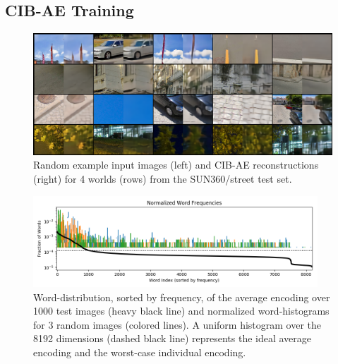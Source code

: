 \subsection{CIB-AE Training}
\begin{figure}
    \centering
    \includegraphics[width=\textwidth]{figures/ptz/mc3ae_encodings}
    \caption{Random example input images (left) and CIB-AE reconstructions (right) for 4 worlds (rows) from the SUN360/street test set.}
    \label{fig:cibae_encodings}
\end{figure}

\begin{figure}
    \centering
    \includegraphics[width=0.95\textwidth]{figures/ptz/word_frequency}
    \caption{Word-distribution, sorted by frequency, of the average encoding over 1000 test images (heavy black line) and normalized
             word-histograms for 3 random images (colored lines). A uniform histogram over the 8192 dimensions (dashed black line) represents the ideal average encoding and the worst-case individual encoding.}
    \label{fig:cibae-words-distribution}
\end{figure}


